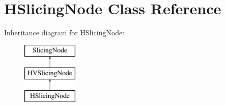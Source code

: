 \hypertarget{class_open_chams_1_1_h_slicing_node}{}\section{H\+Slicing\+Node Class Reference}
\label{class_open_chams_1_1_h_slicing_node}
Inheritance diagram for H\+Slicing\+Node\+:\begin{figure}[H]
\begin{center}
\leavevmode
\includegraphics[height=3.000000cm]{class_open_chams_1_1_h_slicing_node}
\end{center}
\end{figure}
